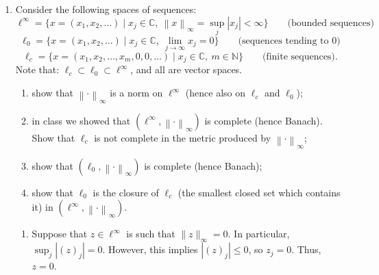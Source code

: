 \documentclass[11pt]{article}
\newcommand{\R}{\mathbb{R}}
\newcommand{\C}{\mathbb{C}}
\newcommand{\N}{\mathbb{N}}
\newcommand{\ellinfty}{\ell^{\infty}}
\newcommand{\ellzero}{\ell_{0}}
\newcommand{\ellc}{\ell_{c}}
\newcommand{\norm}[1]{\left\lVert #1 \right\rVert}
\begin{document}
\begin{enumerate}[label=\arabic*., leftmargin=*, itemsep=10pt]
\begin{enumerate}
        Let $x \in \R$, $\delta > 0$.
        Then, there exists some $y \in (- \pi / 2, \pi /2)$ such that $\arctan(x) = y$.
        But then, $\tan(y) = x$, and since $\tan(x)$ is continuous at $x$, we have that there exists some $\delta' > 0$ such that for all $|y - z'| < \delta'$, $|\tan(y) - \tan(z')| < \delta$.
        However, this implies that for all $z$ with $|\arctan(x) - \arctan(z)| < \delta'$, $|\tan(\arctan(x)) - \tan(\arctan(z))| = |x - z| < \delta$.
        Therefore, $B_{d_1}(x, \delta') \subset B_{d}(x, \delta)$.

        For the other direction, let $x \in \R, \delta > 0$.
        Now, since $\arctan'(x) = \frac{1}{1 + x^2}$, we have that $0 < \arctan'(x) \le 1$ for all $x$.
        Then, by the mean value theorem, this implies $|\arctan(x) - \arctan(y)| = \arctan'(z) \cdot |x - y|$ for some $z \in (x, y)$, so $|\arctan(x) - \arctan(y)| \le 1 \cdot |x - y|$.
        Therefore, if $|x - y| < \delta$, then $|\arctan(x) - \arctan(y)| < \delta$, so $B_{d}(x, \delta) \subset  B_{d_1}(x, \delta)$, as desired.
\end{enumerate}

\item Consider the following spaces of sequences:
\[
\ellinfty=\{x=(x_1,x_2,\dots)\mid x_j\in\C,\ \norm{x}_\infty=\sup_j |x_j|<\infty\}\qquad\text{(bounded sequences)}
\]
\[
\ellzero=\{x=(x_1,x_2,\dots)\mid x_j\in\C,\ \lim_{j\to\infty} x_j=0\}\qquad\text{(sequences tending to $0$)}
\]
\[
\ellc=\{x=(x_1,x_2,\dots,x_m,0,0,\dots)\mid x_j\in\C,\ m\in\N\}\qquad\text{(finite sequences)}.
\]
Note that: $\ellc\subset \ellzero\subset \ellinfty$, and all are vector spaces.
\begin{enumerate}[label=(\alph*), itemsep=4pt]
\item show that $\norm{\cdot}_\infty$ is a norm on $\ellinfty$ (hence also on $\ellc$ and $\ellzero$);
\item in class we showed that $(\ellinfty,\norm{\cdot}_\infty)$ is complete (hence Banach). Show that $\ellc$
is not complete in the metric produced by $\norm{\cdot}_\infty$;
\item show that $(\ellzero,\norm{\cdot}_\infty)$ is complete (hence Banach);
\item show that $\ellzero$ is the closure of $\ellc$ (the smallest closed set which contains it) in
$(\ellinfty,\norm{\cdot}_\infty)$.
\end{enumerate}

\begin{enumerate}
    \item Suppose that $z \in \ell^{\infty}$ is such that $\|z\|_{\infty} = 0$.
        In particular, $\sup_{j} |(z)_j| = 0$.
        However, this implies $|(z)_j| \leq 0$, so $z_j = 0$.
        Thus, $z= 0$.


\end{enumerate}
\end{enumerate}
\end{document}
